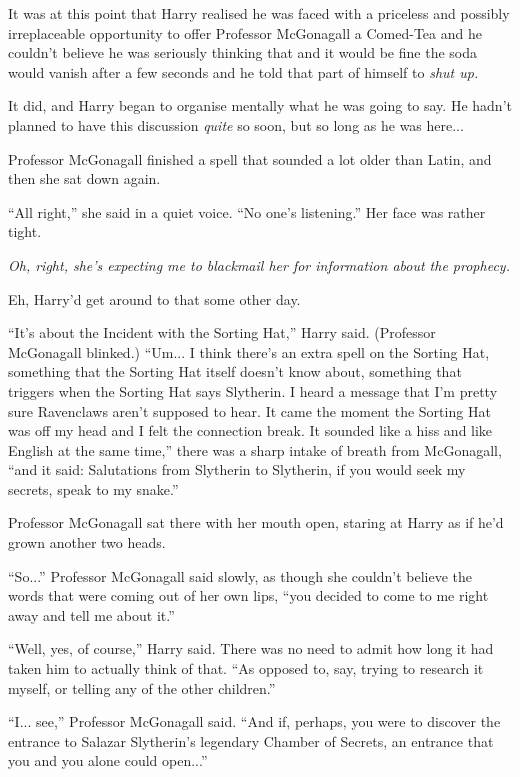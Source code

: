 It was at this point that Harry realised he was faced with a priceless and possibly irreplaceable opportunity to offer Professor McGonagall a Comed-Tea and he couldn't believe he was seriously thinking that and it would be fine the soda would vanish after a few seconds and he told that part of himself to \emph{shut up.}

It did, and Harry began to organise mentally what he was going to say. He hadn't planned to have this discussion \emph{quite} so soon, but so long as he was here...

Professor McGonagall finished a spell that sounded a lot older than Latin, and then she sat down again.

``All right,'' she said in a quiet voice. ``No one's listening.'' Her face was rather tight.

\emph{Oh, right, she's expecting me to blackmail her for information about the prophecy.}

Eh, Harry'd get around to that some other day.

``It's about the Incident with the Sorting Hat,'' Harry said. (Professor McGonagall blinked.) ``Um... I think there's an extra spell on the Sorting Hat, something that the Sorting Hat itself doesn't know about, something that triggers when the Sorting Hat says Slytherin. I heard a message that I'm pretty sure Ravenclaws aren't supposed to hear. It came the moment the Sorting Hat was off my head and I felt the connection break. It sounded like a hiss and like English at the same time,'' there was a sharp intake of breath from McGonagall, ``and it said: Salutations from Slytherin to Slytherin, if you would seek my secrets, speak to my snake.''

Professor McGonagall sat there with her mouth open, staring at Harry as if he'd grown another two heads.

``So...'' Professor McGonagall said slowly, as though she couldn't believe the words that were coming out of her own lips, ``you decided to come to me right away and tell me about it.''

``Well, yes, of course,'' Harry said. There was no need to admit how long it had taken him to actually think of that. ``As opposed to, say, trying to research it myself, or telling any of the other children.''

``I... see,'' Professor McGonagall said. ``And if, perhaps, you were to discover the entrance to Salazar Slytherin's legendary Chamber of Secrets, an entrance that you and you alone could open...''

